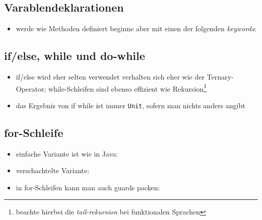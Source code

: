 \subsection{Varablendeklarationen}
\begin{itemize}
  \item werde wie Methoden definiert beginne aber mit einen der folgenden
  \textit{keywords}:
  

\end{itemize}


\subsection{if/else, while und do-while}
\begin{itemize}
  \item if/else wird eher selten verwendet \und verhalten sich eher wie
  der Ternary-Operator; while-Schleifen sind ebenso effizient wie 
  Rekursion\footnote{beachte hierbei die \textit{tail-rekursion} bei
  funktionalen Sprachen}
  
  
  
  \item das Ergebnis von if \und while ist immer \texttt{Unit}, sofern man nichts
  anders angibt
\end{itemize}


\subsection{for-Schleife}
\begin{itemize}
  \item einfache Variante ist wie in Java:
  
  
  
  \item verschachtelte Variante:
  
  
  
  \item in for-Schleifen kann man auch guards packen:
  
  
\end{itemize}


